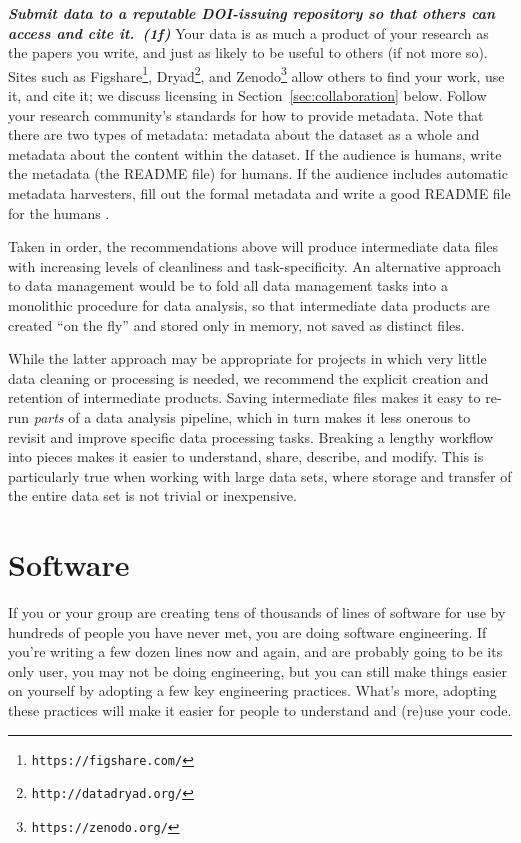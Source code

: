 \documentclass[10pt,letterpaper]{article}
\newcommand{\withurl}[2]{{#1}\footnote{{\texttt{#2}}}}
\newcommand{\practicesection}[2]{\section{#1}\label{#2}}
\newcommand{\practice}[2]{\textbf{\emph{{#2}~({#1})}}}
\begin{document}
\begin{enumerate}
  \practice{1f}{Submit data to a reputable DOI-issuing repository so
  that others can access and cite it.}  Your data is as much a
  product of your research as the papers you write, and just as likely
  to be useful to others (if not more so).  Sites such as
  \withurl{Figshare}{https://figshare.com/},
  \withurl{Dryad}{http://datadryad.org/}, and
  \withurl{Zenodo}{https://zenodo.org/} allow others to find your
  work, use it, and cite it; we discuss licensing in
  Section~\ref{sec:collaboration} below. Follow your research
  community's standards for how to provide metadata. Note that there
  are two types of metadata: metadata about the dataset as a whole and
  metadata about the content within the dataset. If the audience is
  humans, write the metadata (the README file) for humans. If the
  audience includes automatic metadata harvesters, fill out the formal
  metadata and write a good README file for the humans
  \cite{wickes2015}.

\end{enumerate}

Taken in order, the recommendations above will produce intermediate
data files with increasing levels of cleanliness and
task-specificity. An alternative approach to data management would be
to fold all data management tasks into a monolithic procedure for data
analysis, so that intermediate data products are created ``on the
fly'' and stored only in memory, not saved as distinct files.

While the latter approach may be appropriate for projects in which
very little data cleaning or processing is needed, we recommend the
explicit creation and retention of intermediate products. Saving
intermediate files makes it easy to re-run \emph{parts} of a data
analysis pipeline, which in turn makes it less onerous to revisit and
improve specific data processing tasks. Breaking a lengthy workflow
into pieces makes it easier to understand, share, describe, and
modify. This is particularly true when working with large data sets,
where storage and transfer of the entire data set is not trivial or
inexpensive.

\practicesection{Software}{sec:software}

If you or your group are creating tens of thousands of lines of
software for use by hundreds of people you have never met, you are
doing software engineering. If you're writing a few dozen lines now
and again, and are probably going to be its only user, you may not be
doing engineering, but you can still make things easier on yourself by
adopting a few key engineering practices. What's more, adopting these
practices will make it easier for people to understand and (re)use
your code.
\end{document}
